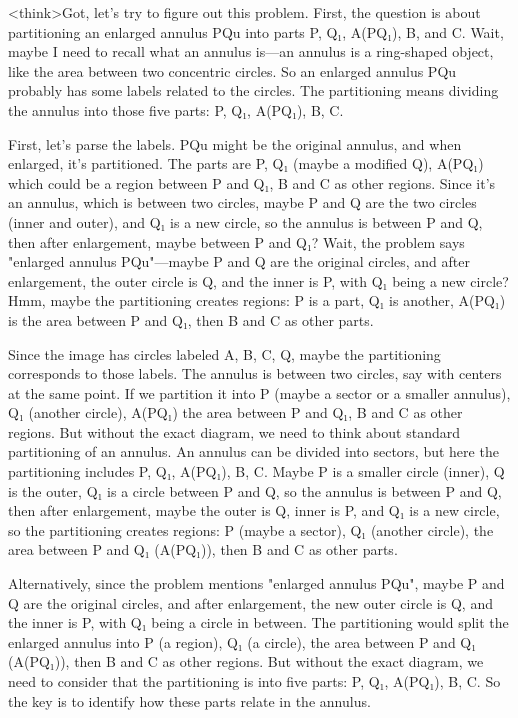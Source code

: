 <think>Got, let's try to figure out this problem. First, the question is about partitioning an enlarged annulus PQu into parts P, Q₁, A(PQ₁), B, and C. Wait, maybe I need to recall what an annulus is—an annulus is a ring-shaped object, like the area between two concentric circles. So an enlarged annulus PQu probably has some labels related to the circles. The partitioning means dividing the annulus into those five parts: P, Q₁, A(PQ₁), B, C. 

First, let's parse the labels. PQu might be the original annulus, and when enlarged, it's partitioned. The parts are P, Q₁ (maybe a modified Q), A(PQ₁) which could be a region between P and Q₁, B and C as other regions. Since it's an annulus, which is between two circles, maybe P and Q are the two circles (inner and outer), and Q₁ is a new circle, so the annulus is between P and Q, then after enlargement, maybe between P and Q₁? Wait, the problem says "enlarged annulus PQu"—maybe P and Q are the original circles, and after enlargement, the outer circle is Q, and the inner is P, with Q₁ being a new circle? Hmm, maybe the partitioning creates regions: P is a part, Q₁ is another, A(PQ₁) is the area between P and Q₁, then B and C as other parts. 

Since the image has circles labeled A, B, C, Q, maybe the partitioning corresponds to those labels. The annulus is between two circles, say with centers at the same point. If we partition it into P (maybe a sector or a smaller annulus), Q₁ (another circle), A(PQ₁) the area between P and Q₁, B and C as other regions. But without the exact diagram, we need to think about standard partitioning of an annulus. An annulus can be divided into sectors, but here the partitioning includes P, Q₁, A(PQ₁), B, C. Maybe P is a smaller circle (inner), Q is the outer, Q₁ is a circle between P and Q, so the annulus is between P and Q, then after enlargement, maybe the outer is Q, inner is P, and Q₁ is a new circle, so the partitioning creates regions: P (maybe a sector), Q₁ (another circle), the area between P and Q₁ (A(PQ₁)), then B and C as other parts. 

Alternatively, since the problem mentions "enlarged annulus PQu", maybe P and Q are the original circles, and after enlargement, the new outer circle is Q, and the inner is P, with Q₁ being a circle in between. The partitioning would split the enlarged annulus into P (a region), Q₁ (a circle), the area between P and Q₁ (A(PQ₁)), then B and C as other regions. But without the exact diagram, we need to consider that the partitioning is into five parts: P, Q₁, A(PQ₁), B, C. So the key is to identify how these parts relate in the annulus. 


